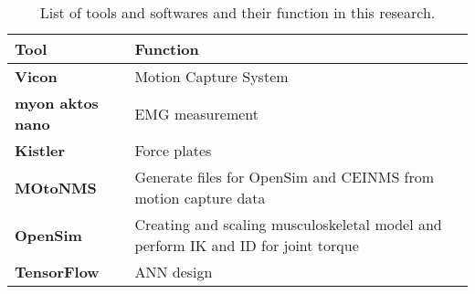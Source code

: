 \begin{table}[ht!]
    \centering
    \caption{List of tools and softwares and their function in this research.}
    \label{tab:tools-and-devices}
    {\def\arraystretch{2}\tabcolsep=5pt
    \begin{tabular}{>{\bf}p{3.5cm}|p{6cm}}
        {\normalfont Tool}  & Function              \\ \hline
        Vicon               & Motion Capture System \\
        myon aktos nano     & EMG measurement       \\
        Kistler             & Force plates          \\
        MOtoNMS             & Generate files for OpenSim and CEINMS from motion capture data \\
        OpenSim             & Creating and scaling musculoskeletal model and perform \ac{IK} and \ac{ID} for joint torque \\%
        TensorFlow          & \ac{ANN} design
    \end{tabular}
    }
\end{table}

  